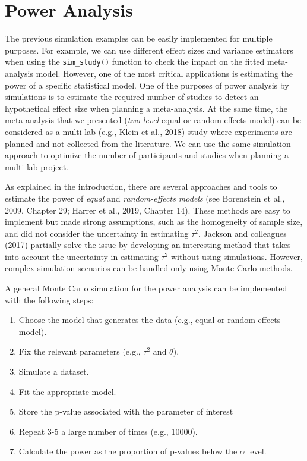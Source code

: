 \documentclass[
  man,floatsintext]{apa6}
\providecommand{\tightlist}{%
  \setlength{\itemsep}{0pt}\setlength{\parskip}{0pt}}
\begin{document}
\normalsize

\section{Power Analysis}\label{power-analysis}

The previous simulation examples can be easily implemented for multiple purposes. For example, we can use different effect sizes and variance estimators when using the \texttt{sim\_study()} function to check the impact on the fitted meta-analysis model. However, one of the most critical applications is estimating the power of a specific statistical model. One of the purposes of power analysis by simulations is to estimate the required number of studies to detect an hypothetical effect size when planning a meta-analysis. At the same time, the meta-analysis that we presented (\emph{two-level} equal or random-effects model) can be considered as a multi-lab (e.g., Klein et al., 2018) study where experiments are planned and not collected from the literature. We can use the same simulation approach to optimize the number of participants and studies when planning a multi-lab project.

As explained in the introduction, there are several approaches and tools to estimate the power of \emph{equal} and \emph{random-effects models} (see Borenstein et al., 2009, Chapter 29; Harrer et al., 2019, Chapter 14). These methods are easy to implement but made strong assumptions, such as the homogeneity of sample size, and did not consider the uncertainty in estimating \(\tau^{2}\). Jackson and colleagues (2017) partially solve the issue by developing an interesting method that takes into account the uncertainty in estimating \(\tau^{2}\) without using simulations. However, complex simulation scenarios can be handled only using Monte Carlo methods.

A general Monte Carlo simulation for the power analysis can be implemented with the following steps:

\begin{enumerate}
\def\labelenumi{\arabic{enumi}.}
\tightlist
\item
  Choose the model that generates the data (e.g., equal or random-effects model).
\item
  Fix the relevant parameters (e.g., \(\tau^{2}\) and \(\theta\)).
\item
  Simulate a dataset.
\item
  Fit the appropriate model.
\item
  Store the p-value associated with the parameter of interest
\item
  Repeat 3-5 a large number of times (e.g., 10000).
\item
  Calculate the power as the proportion of p-values below the \(\alpha\) level.
\end{enumerate}
\end{document}
